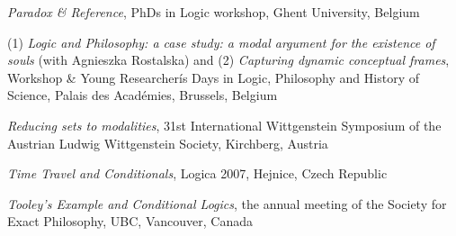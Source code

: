 \documentclass[10pt, a4paper]{article}
\newcommand{\years}[1]{\marginnote{\normalsize #1}}
\begin{document}

  \emph{Paradox \& Reference},   PhDs in Logic workshop,    Ghent University, Belgium


\vspace{0.5mm}





(1) \emph{Logic and Philosophy: a case study: a modal argument for the existence of souls}  (with Agnieszka  Rostalska) and (2) \emph{Capturing dynamic conceptual frames}, Workshop \& Young Researcherís Days in Logic, Philosophy and History of Science,  Palais des Acad\'emies, Brussels, Belgium






\vspace{0.5mm}


 \emph{Reducing sets to modalities}, 31st  International \mbox{Wittgenstein} Symposium of the Austrian Ludwig \mbox{Wittgenstein} Society,  Kirchberg, Austria



\vspace{0.5mm}










 \emph{Time Travel and Conditionals},   Logica 2007,   Hejnice, Czech Republic





\vspace{0.5mm}


  \emph{Tooley's Example and Conditional Logics}, the annual meeting of the Society for Exact Philosophy,      UBC, Vancouver, Canada
\end{document}
